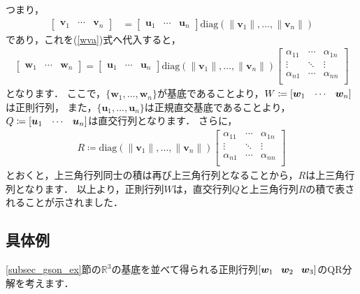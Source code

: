 \documentclass[dvipdfmx]{jsarticle}
\theoremstyle{definition}
\newcommand{\diag}[1]{\mathrm{diag}(#1)}
\newcommand{\hs}[1]{\hspace{#1em}}
\newcommand{\hv}[3]{[#1 \hs{0.8} #2 \hs{0.8} #3]}
\begin{document}
つまり，
\begin{align}
    \begin{bmatrix} \bm{v}_1 & \cdots & \bm{v}_n \end{bmatrix}
    &= \begin{bmatrix} \bm{u}_1 & \cdots & \bm{u}_n \end{bmatrix}
    \diag{\| \bm{v}_1 \|, \ldots, \| \bm{v}_n \|}
    \label{vudiagnv}
\end{align}
であり，これを(\ref{wva})式へ代入すると，
\begin{align}
    \begin{bmatrix} \bm{w}_1 & \cdots & \bm{w}_n \end{bmatrix}
    = \begin{bmatrix} \bm{u}_1 & \cdots & \bm{u}_n \end{bmatrix}
    \diag{\| \bm{v}_1 \|, \ldots, \| \bm{v}_n \|}
    \begin{bmatrix}
        \alpha_{11} & \cdots & \alpha_{1n} \\
        \vdots & \ddots & \vdots \\
        \alpha_{n1} & \cdots & \alpha_{nn} \\
    \end{bmatrix}
    \label{wvdiagnvalp}
\end{align}
となります．
ここで，$\{ \bm{w}_1, \ldots, \bm{w}_n \}$が基底であることより，$W \coloneqq \hv{\bm{w}_1}{\cdots}{\bm{w}_n}$は正則行列，
また，$\{ \bm{u}_1, \ldots, \bm{u}_n \}$は正規直交基底であることより，$Q \coloneqq \hv{\bm{u}_1}{\cdots}{\bm{u}_n}$は直交行列となります．
さらに，
\begin{align}
    R \coloneqq \diag{\| \bm{v}_1 \|, \ldots, \| \bm{v}_n \|}
    \begin{bmatrix}
        \alpha_{11} & \cdots & \alpha_{1n} \\
        \vdots & \ddots & \vdots \\
        \alpha_{n1} & \cdots & \alpha_{nn} \\
    \end{bmatrix}
    \label{rdiagvnalp}
\end{align}
とおくと，上三角行列同士の積は再び上三角行列となることから，$R$は上三角行列となります．
以上より，正則行列$W$は，直交行列$Q$と上三角行列$R$の積で表されることが示されました．


\subsection{具体例}  \label{subsec_qrdecom_ex}
\ref{subsec_gson_ex}節の$\mathbb{R}^3$の基底を並べて得られる正則行列$\hv{\bm{w}_1}{\bm{w}_2}{\bm{w}_3}$のQR分解を考えます．
\end{document}
